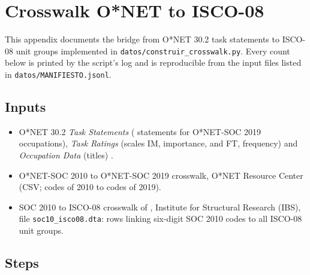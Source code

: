 \section{Crosswalk O*NET to ISCO-08}
\label{app:crosswalk}

This appendix documents the bridge from O*NET 30.2 task statements to ISCO-08 unit groups implemented in \texttt{datos/construir\_crosswalk.py}.
Every count below is printed by the script's log and is reproducible from the input files listed in \texttt{datos/MANIFIESTO.jsonl}.

\subsection{Inputs}

\begin{itemize}
  \item O*NET 30.2 \emph{Task Statements} ( statements for  O*NET-SOC 2019 occupations), \emph{Task Ratings} (scales IM, importance, and FT, frequency) and \emph{Occupation Data} (titles) \citep{onet2026database}.
  \item O*NET-SOC 2010 to O*NET-SOC 2019 crosswalk, O*NET Resource Center (CSV;  codes of 2010 to  codes of 2019).
  \item SOC 2010 to ISCO-08 crosswalk of \citet{hardy2018educational}, Institute for Structural Research (IBS), file \texttt{soc10\_isco08.dta}:  rows linking  six-digit SOC 2010 codes to all  ISCO-08 unit groups.
\end{itemize}

\subsection{Steps}

